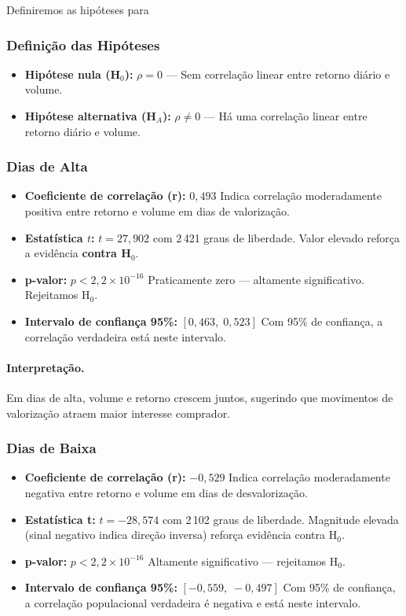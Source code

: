 Definiremos as hipóteses para 


\subsubsection{Definição das Hipóteses}
\begin{itemize}
  \item \textbf{Hipótese nula (H$_0$):} $\rho = 0$ — Sem correlação linear entre retorno diário e volume.
  \item \textbf{Hipótese alternativa (H$_A$):} $\rho \neq 0$ — Há uma correlação linear entre retorno diário e volume.
\end{itemize}

\subsubsection{Dias de Alta}
\begin{itemize}
  \item \textbf{Coeficiente de correlação (r):} $0,493$  
    Indica correlação moderadamente positiva entre retorno e volume em dias de valorização.
  \item \textbf{Estatística $t$:} $t = 27{,}902$ com 2\,421 graus de liberdade.  
    Valor elevado reforça a evidência \textbf{contra H$_0$}.
  \item \textbf{p-valor:} $p < 2{,}2\times10^{-16}$  
    Praticamente zero — altamente significativo. Rejeitamos H$_0$.
  \item \textbf{Intervalo de confiança 95\%:} $[0,463,\;0,523]$  
    Com 95\% de confiança, a correlação verdadeira está neste intervalo.
\end{itemize}

\paragraph{Interpretação.}
Em dias de alta, volume e retorno crescem juntos, sugerindo que movimentos de valorização atraem maior interesse comprador.

\subsubsection{Dias de Baixa}
\begin{itemize}
  \item \textbf{Coeficiente de correlação (r):} $-0,529$  
    Indica correlação moderadamente negativa entre retorno e volume em dias de desvalorização.
  \item \textbf{Estatística t:} $t = -28{,}574$ com 2\,102 graus de liberdade.  
    Magnitude elevada (sinal negativo indica direção inversa) reforça evidência contra H$_0$.
  \item \textbf{p-valor:} $p < 2{,}2\times10^{-16}$  
    Altamente significativo — rejeitamos H$_0$.
  \item \textbf{Intervalo de confiança 95\%:} $[-0,559,\;-0,497]$  
    Com 95\% de confiança, a correlação populacional verdadeira é negativa e está neste intervalo.
\end{itemize}

